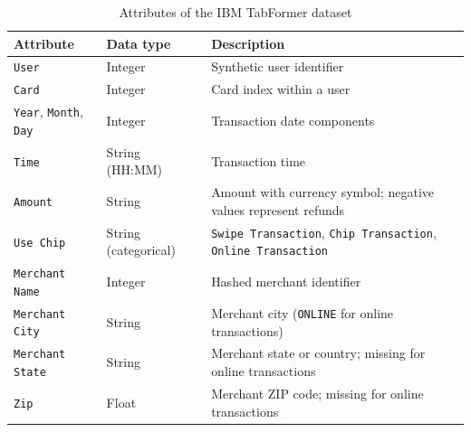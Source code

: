 \documentclass[titlepage]{article}
\begin{document}
\begin{table}[H]
    \centering
    \caption{Attributes of the IBM TabFormer dataset}
    \label{tab:tabformer}
    \small
    \renewcommand{\arraystretch}{1.3}
    \begin{tabularx}{\textwidth}{@{}l l X@{}}
        \toprule
        \textbf{Attribute} & \textbf{Data type} & \textbf{Description} \\
        \midrule

        \texttt{User} & Integer & Synthetic user identifier \\

        \addlinespace

        \texttt{Card} & Integer & Card index within a user \\

        \addlinespace

        \texttt{Year}, \texttt{Month}, \texttt{Day} & Integer & Transaction date components \\

        \addlinespace

        \texttt{Time} & String (HH:MM) & Transaction time \\

        \addlinespace

        \texttt{Amount} & String & Amount with currency symbol; negative values represent refunds \\

        \addlinespace

        \texttt{Use Chip} & String (categorical) & \texttt{Swipe Transaction}, \texttt{Chip Transaction}, \texttt{Online Transaction} \\

        \addlinespace

        \texttt{Merchant Name} & Integer & Hashed merchant identifier \\

        \addlinespace

        \texttt{Merchant City} & String & Merchant city (\texttt{ONLINE} for online transactions) \\

        \addlinespace

        \texttt{Merchant State} & String & Merchant state or country; missing for online transactions \\

        \addlinespace

        \texttt{Zip} & Float & Merchant ZIP code; missing for online transactions \\


\end{tabularx}
\end{table}
\end{document}
